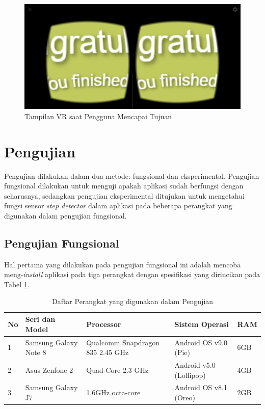 \begin{figure}
\centering
\includegraphics[scale=0.15]{Gambar/finished-page.png}
    \caption{Tampilan VR saat Pengguna Mencapai Tujuan}
    \label{fig:finished-page}
\end{figure}

\section{Pengujian}
Pengujian dilakukan dalam dua metode: fungsional dan eksperimental. Pengujian fungsional dilakukan untuk menguji apakah aplikasi sudah berfungsi dengan seharusnya, sedangkan pengujian eksperimental ditujukan untuk mengetahui fungsi sensor \textit{step detector} dalam aplikasi pada beberapa perangkat yang digunakan dalam pengujian fungsional.

\subsection{Pengujian Fungsional}
\label{subs:fungtional-test}
Hal pertama yang dilakukan pada pengujian fungsional ini adalah mencoba meng-\textit{install} aplikasi pada tiga perangkat dengan spesifikasi yang dirincikan pada Tabel \ref{tab:hardware-test}. 

\begin{table}[]
    \centering
    \caption{Daftar Perangkat yang digunakan dalam Pengujian}
    \begin{tabular}{|p{1cm}||p{4cm}|p{4cm}|p{4cm}|p{2cm}|}
    \hline
       No & Seri dan Model & Processor & Sistem Operasi & RAM \\
    \hline
        1 & Samsung Galaxy Note 8 & Qualcomm Snapdragon 835 2.45 GHz & Android OS v9.0 (Pie) & 6GB\\
    \hline
        2 & Asus Zenfone 2 & Quad-Core 2.3 GHz & Android v5.0 (Lollipop) & 4GB \\
    \hline
        3 & Samsung Galaxy J7 & 1.6GHz octa-core & Android OS v8.1 (Oreo) & 2GB\\
    \hline
    \end{tabular}
    \label{tab:hardware-test}
\end{table}

